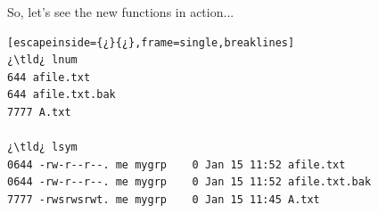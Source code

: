 So, let's see the new functions in action...

\begin{lstlisting}[escapeinside={¿}{¿},frame=single,breaklines]
¿\tld¿ lnum
644 afile.txt
644 afile.txt.bak
7777 A.txt

¿\tld¿ lsym
0644 -rw-r--r--. me mygrp    0 Jan 15 11:52 afile.txt
0644 -rw-r--r--. me mygrp    0 Jan 15 11:52 afile.txt.bak
7777 -rwsrwsrwt. me mygrp    0 Jan 15 11:45 A.txt	
\end{lstlisting}




	
